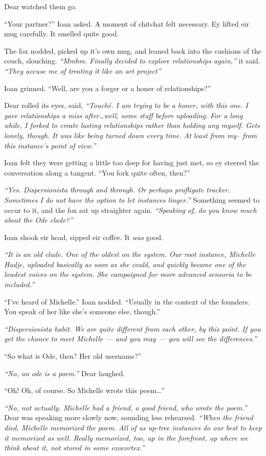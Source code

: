 Dear watched them go.

``Your partner?'' Ioan asked. A moment of chitchat felt necessary. Ey lifted eir mug carefully. It smelled quite good.

The fox nodded, picked up it's own mug, and leaned back into the cushions of the couch, slouching. \emph{``Mmhm. Finally decided to explore relationships again,''} it said. \emph{``They accuse me of treating it like an art project''}

Ioan grinned. ``Well, are you a forger or a honer of relationships?''

Dear rolled its eyes, said, \emph{``Touché. I am trying to be a honer, with this one. I gave relationships a miss after\ldots{}well, some stuff before uploading. For a long while, I forked to create lasting relationships rather than holding any myself. Gets lonely, though. It was like being turned down every time. At least from my-- from this instance's point of view.''}

Ioan felt they were getting a little too deep for having just met, so ey steered the conversation along a tangent. ``You fork quite often, then?''

\emph{``Yes. Dispersionista through and through. Or perhaps profligate tracker. Sometimes I do not have the option to let instances linger.''} Something seemed to occur to it, and the fox sat up straighter again. \emph{``Speaking of, do you know much about the Ode clade?''}

Ioan shook eir head, sipped eir coffee. It \emph{was} good.

\emph{``It is an old clade. One of the oldest on the system. Our root instance, Michelle Hadje, uploaded basically as soon as she could, and quickly became one of the loudest voices on the system. She campaigned for more advanced sensoria to be included.''}

``I've heard of Michelle.'' Ioan nodded. ``Usually in the context of the founders. You speak of her like she's someone else, though.''

\emph{``Dispersionista habit. We are quite different from each other, by this point. If you get the chance to meet Michelle — and you may — you will see the differences.''}

``So what is Ode, then? Her old username?''

\emph{``No, an ode is a poem.''} Dear laughed.

``Oh! Oh, of course. So Michelle wrote this poem\ldots{}''

\emph{``No, not actually. Michelle had a friend, a good friend, who wrote the poem.''} Dear was speaking more slowly now, sounding less rehearsed. \emph{``When the friend died, Michelle memorized the poem. All of us up-tree instances do our best to keep it memorized as well. Really memorized, too, up in the forefront, up where we think about it, not stored in some exocortex.''}

